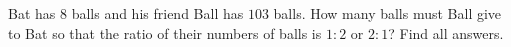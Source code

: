 Bat has $8$ balls and his friend Ball has $103$ balls. How many balls must Ball give to Bat so that the ratio of their numbers of balls is $1:2$ or $2:1$? Find all answers.
